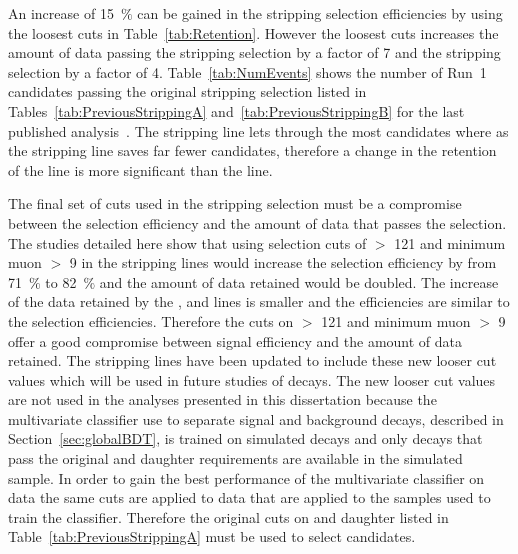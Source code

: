 An increase of 15~$\%$ can be gained in the stripping selection efficiencies by using the loosest cuts in Table~\ref{tab:Retention}. However the loosest cuts increases the amount of data passing the \bmumu stripping selection by a factor of 7 and the \bhh stripping selection by a factor of 4. Table~\ref{tab:NumEvents} shows the number of Run~1 candidates passing the original stripping selection listed in Tables~\ref{tab:PreviousStrippingA} and~\ref{tab:PreviousStrippingB} for the last published analysis~\cite{CMS:2014xfa}. The \bhh stripping line lets through the most candidates where as the \bmumu stripping line saves far fewer candidates, therefore a change in the retention of the \bhh line is more significant than the \bmumu line. 


The final set of cuts used in the stripping selection must be a compromise between the selection efficiency and the amount of data that passes the selection. The studies detailed here show that using selection cuts of \bs \chiFD $>$ 121 and minimum muon \chiIP $>$ 9 in the stripping lines would increase the \bmumu selection efficiency by from 71~$\%$ to 82~$\%$ and the amount of data retained would be doubled. The increase of the data retained by the \bhh, \bujpsik and \bsjpsiphi lines is smaller and the efficiencies are similar to the \bmumu selection efficiencies. Therefore the cuts on \bs \chiFD $>$ 121 and minimum muon \chiIP $>$ 9 offer a good compromise between signal efficiency and the amount of data retained. The stripping lines have been updated to include these new looser cut values which will be used in future studies of \bmumu decays. The new looser cut values are not used in the analyses presented in this dissertation because the multivariate classifier use to separate signal and background decays, described in Section~\ref{sec:globalBDT}, is trained on simulated \bbbarmumux decays and only decays that pass the original \chiFD and daughter \chiIP requirements are available in the simulated sample. In order to gain the best performance of the multivariate classifier on data the same cuts are applied to data that are applied to the samples used to train the classifier. Therefore the original cuts on \chiFD and daughter \chiIP listed in Table~\ref{tab:PreviousStrippingA} must be used to select \bsmumu candidates. 

